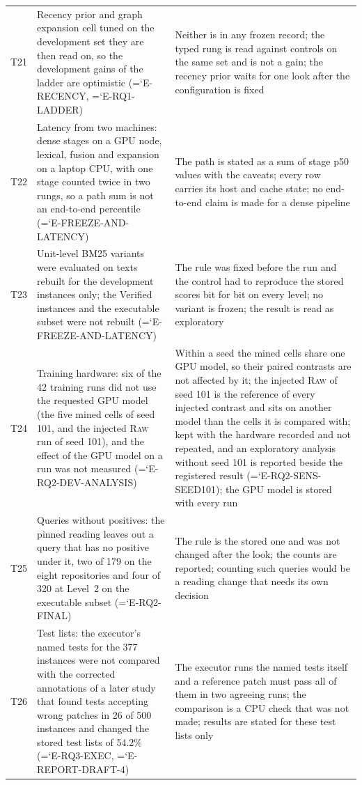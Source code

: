 \documentclass[10pt,twocolumn]{article}
\newcommand{\entry}[1]{{\ttfamily\hyphenchar\font=`\-\relax #1}}
\begin{document}
\begin{table}[t]
\begin{tabular}{@{}p{}p{}p{}@{}}
T21 & Recency prior and graph expansion cell tuned on the development set they are then read on, so the development gains of the ladder are optimistic (\entry{E-RECENCY}, \entry{E-RQ1-LADDER}) & Neither is in any frozen record; the typed rung is read against controls on the same set and is not a gain; the recency prior waits for one look after the configuration is fixed \\
T22 & Latency from two machines: dense stages on a GPU node, lexical, fusion and expansion on a laptop CPU, with one stage counted twice in two rungs, so a path sum is not an end-to-end percentile (\entry{E-FREEZE-AND-LATENCY}) & The path is stated as a sum of stage p50 values with the caveats; every row carries its host and cache state; no end-to-end claim is made for a dense pipeline \\
T23 & Unit-level BM25 variants were evaluated on texts rebuilt for the development instances only; the Verified instances and the executable subset were not rebuilt (\entry{E-FREEZE-AND-LATENCY}) & The rule was fixed before the run and the control had to reproduce the stored scores bit for bit on every level; no variant is frozen; the result is read as exploratory \\
T24 & Training hardware: six of the 42 training runs did not use the requested GPU model (the five mined cells of seed 101, and the injected \textsc{Raw} run of seed 101), and the effect of the GPU model on a run was not measured (\entry{E-RQ2-DEV-ANALYSIS}) & Within a seed the mined cells share one GPU model, so their paired contrasts are not affected by it; the injected \textsc{Raw} of seed 101 is the reference of every injected contrast and sits on another model than the cells it is compared with; kept with the hardware recorded and not repeated, and an exploratory analysis without seed 101 is reported beside the registered result (\entry{E-RQ2-SENS-SEED101}); the GPU model is stored with every run \\
T25 & Queries without positives: the pinned reading leaves out a query that has no positive under it, two of 179 on the eight repositories and four of 320 at Level~2 on the executable subset (\entry{E-RQ2-FINAL}) & The rule is the stored one and was not changed after the look; the counts are reported; counting such queries would be a reading change that needs its own decision \\
T26 & Test lists: the executor's named tests for the 377 instances were not compared with the corrected annotations of a later study that found tests accepting wrong patches in 26 of 500 instances and changed the stored test lists of 54.2\% (\entry{E-RQ3-EXEC}, \entry{E-REPORT-DRAFT-4}) & The executor runs the named tests itself and a reference patch must pass all of them in two agreeing runs; the comparison is a CPU check that was not made; results are stated for these test lists only \\

\end{tabular}
\end{table}
\end{document}
